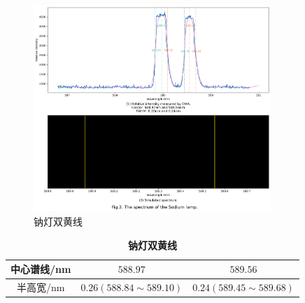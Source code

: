 \documentclass[12pt,a4paper,UTF8]{ctexart}
\begin{document}
\begin{figure}[htbp]
	\centering
	\includegraphics[width=0.8\textwidth]{attachments//Fig.3.png}
	\caption{钠灯双黄线}
	\label{fig:3}
\end{figure}

\begin{table}[htbp]
	\centering
	\begin{tabular}{ccc}
	\toprule
	中心谱线/nm &$588.97$ &$589.56$ \\
	\midrule
	半高宽/nm &$0.26(588.84\sim 589.10)$ &$0.24(589.45\sim 589.68)$  \\
	\bottomrule
    \end{tabular}
	\caption{\textbf{钠灯双黄线}}
    \label{tab:3}
\end{table}

\newpage
\end{document}
